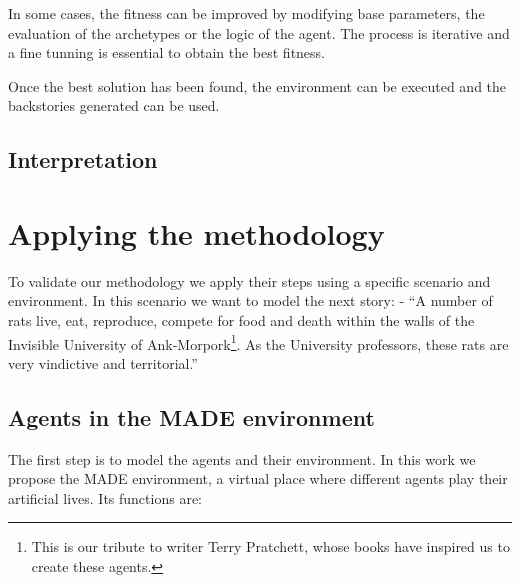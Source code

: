 \documentclass{sig-alternate}
\begin{document}
In some cases, the fitness can be improved by modifying base parameters, the evaluation of the archetypes or the logic of the agent. The process is iterative and a fine tunning is essential to obtain the best fitness.

Once the best solution has been found, the environment can be executed and the backstories generated can be used.

\subsection{Interpretation}




\section{Applying the methodology}
\label{sec:applying}

To validate our methodology we apply their steps using a specific scenario and environment. In this scenario we want to model the next story: %
 - ``A number of rats live, eat, reproduce, compete for food and death within the walls of the Invisible University of Ank-Morpork\footnote{This is our tribute to writer Terry Pratchett, whose books have inspired us to create these agents.}. As the University professors, these rats are very vindictive and territorial.''

\subsection{Agents in the MADE environment}

The first step is to model the agents and their environment. In this work we propose the MADE environment, a virtual place where different agents play their artificial lives. Its functions are:
\end{document}
